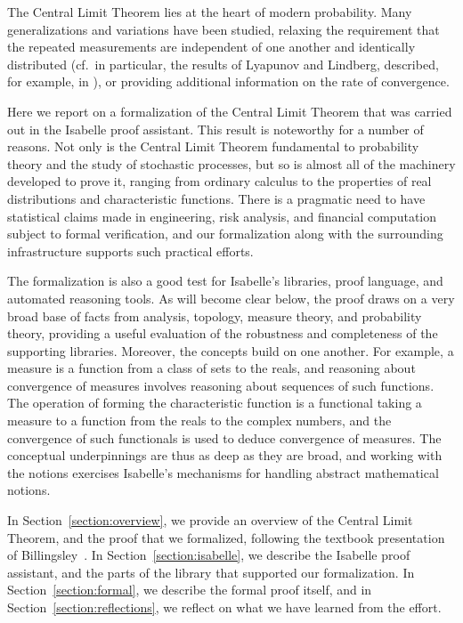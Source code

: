 \documentclass{svjour3}
\begin{document}
The Central Limit Theorem lies at the heart of modern probability. Many generalizations and variations have been studied, relaxing the requirement that the repeated measurements are independent of one another and identically distributed (cf.~in particular, the results of Lyapunov and Lindberg, described, for example, in \cite{billingsley:95}), or providing additional information on the rate of convergence.

Here we report on a formalization of the Central Limit Theorem that was carried out in the Isabelle proof assistant. This result is noteworthy for a number of reasons. Not only is the Central Limit Theorem fundamental to probability theory and the study of stochastic processes, but so is almost all of the machinery developed to prove it, ranging from ordinary calculus to the properties of real distributions and characteristic functions. There is a pragmatic need to have statistical claims made in engineering, risk analysis, and financial computation subject to formal verification, and our formalization along with the surrounding infrastructure supports such practical efforts.

The formalization is also a good test for Isabelle's libraries, proof language, and automated reasoning tools. As will become clear below, the proof draws on a very broad base of facts from analysis, topology, measure theory, and probability theory, providing a useful evaluation of the robustness and completeness of the supporting libraries. Moreover, the concepts build on one another. For example, a measure is a function from a class of sets to the reals, and reasoning about convergence of measures involves reasoning about sequences of such functions. The operation of forming the characteristic function is a functional taking a measure to a function from the reals to the complex numbers, and the convergence of such functionals is used to deduce convergence of measures. The conceptual underpinnings are thus as deep as they are broad, and working with the notions exercises Isabelle's mechanisms for handling abstract mathematical notions.

In Section~\ref{section:overview}, we provide an overview of the Central Limit Theorem, and the proof that we formalized, following the textbook presentation of Billingsley~\cite{billingsley:95}. In Section~\ref{section:isabelle}, we describe the Isabelle proof assistant, and the parts of the library that supported our formalization. In Section~\ref{section:formal}, we describe the formal proof itself, and in Section~\ref{section:reflections}, we reflect on what we have learned from the effort. 
\end{document}
